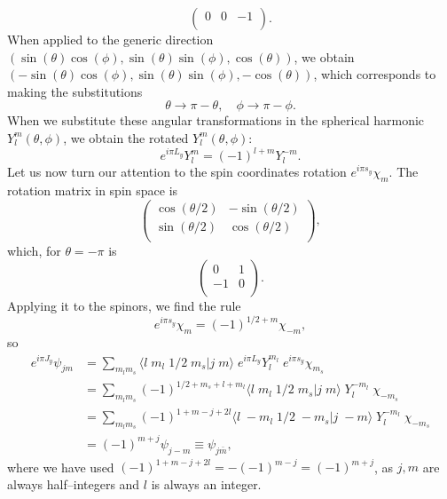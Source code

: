 \begin{subappendices}
\begin{equation}
\begin{pmatrix}
  0 & 0 & -1 \\
\end{pmatrix}.
\end{equation}
When applied to the generic direction $(\sin(\theta)\cos(\phi),\sin(\theta)\sin(\phi),\cos(\theta))$, we obtain $(-\sin(\theta)\cos(\phi),\sin(\theta)\sin(\phi),-\cos(\theta))$, which corresponds to making the substitutions
 \begin{equation}\label{eq42}
\theta\rightarrow \pi-\theta, \quad \phi\rightarrow \pi-\phi.
\end{equation}
When we substitute these angular transformations in the spherical harmonic $Y_l^m(\theta,\phi)$,  we obtain the rotated $Y_l^m(\theta,\phi)$:
 \begin{equation}\label{eq43}
e^{i\pi L_y} Y_{l}^m=(-1)^{l+m}Y_{l}^{-m}.
\end{equation}
Let us now turn our attention to the spin coordinates rotation $e^{i\pi s_y}\chi_m$. The rotation matrix in spin space is
\begin{equation}\label{eq44}
\begin{pmatrix}
  \cos(\theta/2) & -\sin(\theta/2) \\
 \sin(\theta/2) & \cos(\theta/2) \\
\end{pmatrix},
\end{equation}
which, for $\theta=-\pi$ is
\begin{equation}\label{eq45}
\begin{pmatrix}
  0 & 1 \\
 -1 & 0 \\
\end{pmatrix}.
\end{equation}
Applying it to the spinors, we find the rule
\begin{equation}\label{eq46}
e^{i\pi s_y}\chi_m=(-1)^{1/2+m}\chi_{-m},
\end{equation}
so
\begin{equation}\label{eq47}
\begin{split}
e^{i\pi J_y} \psi_{jm}&=\sum_{m_lm_s}\langle l \; m_l \;1/2\; m_s|j\; m\rangle\; e^{i\pi L_y}Y_{l}^{m_l}\;e^{i\pi s_y}\chi_{m_s}\\
&=\sum_{m_lm_s}(-1)^{1/2+m_s+l+m_l}\langle l \; m_l \;1/2\; m_s|j\; m\rangle\; Y_{l}^{-m_l}\;\chi_{-m_s}\\
&=\sum_{m_lm_s}(-1)^{1+m-j+2l}\langle l \; -m_l \;1/2\; -m_s|j\; -m\rangle\; Y_{l}^{-m_l}\;\chi_{-m_s}\\
&=(-1)^{m+j}\psi_{j-m}\equiv \psi_{j\bar m},
\end{split}
\end{equation}
where we have used  $(-1)^{1+m-j+2l}=-(-1)^{m-j}=(-1)^{m+j}$, as $j,m$ are always half--integers and $l$ is always an integer.




\end{subappendices}
